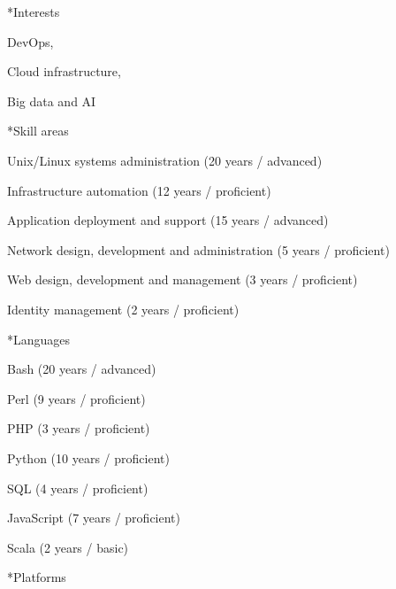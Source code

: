 \documentclass[10pt, a4paper, final]{article}
\begin{document}
\begin{minipage}[t]{0.32\linewidth}
\begin{section}
    \vspace{2em}
    \small
    \begin{subsection}*{Interests}
      \begin{inparadesc}
        \item DevOps,
        \item Cloud infrastructure,
        \item Big data and AI
      \end{inparadesc}
    \end{subsection}
    \vspace{1em}
    \begin{subsection}*{Skill areas}
      \begin{compactitem}
        \item Unix/Linux systems administration (20 years / advanced) 
        \item Infrastructure automation (12 years / proficient) 
        \item Application deployment and support (15 years / advanced) 
        \item Network design, development and administration (5 years / proficient) 
        \item Web design, development and management (3 years / proficient) 
        \item Identity management (2 years / proficient) 
      \end{compactitem}
    \end{subsection}
    \vspace{1em}
    \begin{subsection}*{Languages}
      \begin{compactitem}
        \item Bash (20 years / advanced) 
        \item Perl (9 years / proficient) 
        \item PHP (3 years / proficient) 
        \item Python (10 years / proficient) 
        \item SQL (4 years / proficient) 
        \item JavaScript (7 years / proficient) 
        \item Scala (2 years / basic) 
      \end{compactitem}
    \end{subsection}
    \vspace{1em}
    \begin{subsection}*{Platforms}
      \begin{compactitem}

\end{compactitem}
\end{subsection}
\end{section}
\end{minipage}
\end{document}
